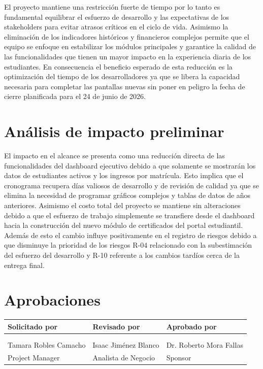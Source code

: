 \documentclass[11pt,spanish]{article}
\begin{document}
El proyecto mantiene una restricción fuerte de tiempo por lo tanto es fundamental equilibrar el esfuerzo de desarrollo y las expectativas de los stakeholders para evitar atrasos críticos en el ciclo de vida. Asimismo la eliminación de los indicadores históricos y financieros complejos permite que el equipo se enfoque en estabilizar los módulos principales y garantice la calidad de las funcionalidades que tienen un mayor impacto en la experiencia diaria de los estudiantes. En consecuencia el beneficio esperado de esta reducción es la optimización del tiempo de los desarrolladores ya que se libera la capacidad necesaria para completar las pantallas nuevas sin poner en peligro la fecha de cierre planificada para el 24 de junio de 2026.

\section{Análisis de impacto preliminar}

El impacto en el alcance se presenta como una reducción directa de las funcionalidades del dashboard ejecutivo debido a que solamente se mostrarán los datos de estudiantes activos y los ingresos por matrícula. Esto implica que el cronograma recupera días valiosos de desarrollo y de revisión de calidad ya que se elimina la necesidad de programar gráficos complejos y tablas de datos de años anteriores. Asimismo el costo total del proyecto se mantiene sin alteraciones debido a que el esfuerzo de trabajo simplemente se transfiere desde el dashboard hacia la construcción del nuevo módulo de certificados del portal estudiantil. Además de esto el cambio influye positivamente en el registro de riesgos debido a que disminuye la prioridad de los riesgos R-04 relacionado con la subestimación del esfuerzo del desarrollo y R-10 referente a los cambios tardíos cerca de la entrega final.

\section{Aprobaciones}

\begin{table}[H]
\centering
\begin{tabularx}{\textwidth}{Y Y Y}
\toprule
\textbf{Solicitado por} & \textbf{Revisado por} & \textbf{Aprobado por} \\
\midrule
& & \\
& & \\
Tamara Robles Camacho & Isaac Jiménez Blanco & Dr. Roberto Mora Fallas \\
Project Manager & Analista de Negocio & Sponsor \\
\bottomrule
\end{tabularx}
\end{table}
\end{document}
